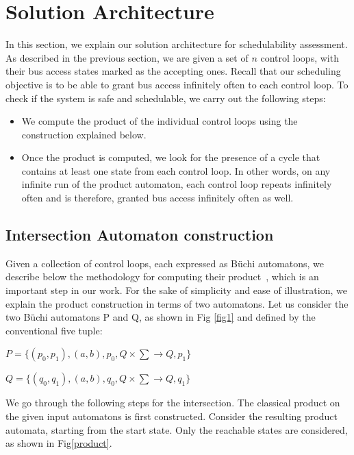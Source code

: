 \section{Solution Architecture} \label{sec4}
\noindent
In this section, we explain our solution architecture for schedulability assessment. As described in the previous section, we are given a set of $n$ control loops, with their bus access states marked as the accepting ones. Recall that our scheduling objective is to be able to grant bus access infinitely often to each control loop. To check if the system is safe and schedulable, we carry out the following steps: 

\begin{itemize}

\item We compute the product of the individual control loops using the construction explained below. 

\item Once the product is computed, we look for the presence of a cycle that contains at least one state from each control loop. In other words, on any infinite run of the product automaton, each control loop repeats infinitely often and is therefore, granted bus access infinitely often as well. 

\end{itemize}


\subsection{Intersection Automaton construction}
\noindent
Given a collection of control loops, each expressed as B\"{u}chi automatons, we describe below the methodology for computing their product~\cite{DBLP:books/ws/automata2012/ChevalierDMP12}, which is an important step in our work. For the sake of simplicity and ease of illustration, we explain the product construction in terms of two automatons. 
Let us consider the two B\"{u}chi automatons P and Q, as shown in Fig \ref{fig1} and defined by the
conventional five tuple:

$P = \{(p_0,p_1),(a,b),p_0, Q \times \sum \rightarrow Q,p_1\}$

$Q = \{(q_0,q_1),(a,b),q_0, Q \times \sum \rightarrow Q,q_1\}$


\noindent
We go through the 
following steps for the intersection. 
The classical product on the given input automatons is first constructed. Consider the resulting product automata, starting from the start state. Only the reachable states are considered, as shown in Fig\ref{product}.

